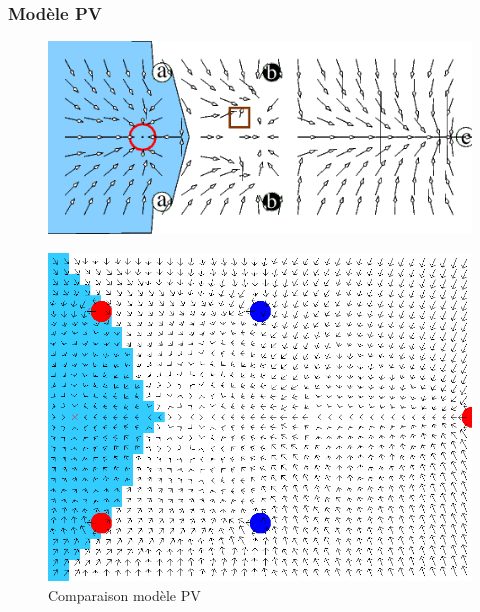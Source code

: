 \documentclass{beamer}
\begin{document}
\begin{frame}
  \frametitle{Modèle PV}
  \begin{figure}
    \centering
    \includegraphics[scale=0.3]{pv_article.png}
  \end{figure}
  \begin{figure}
    \centering
    \includegraphics[scale=0.15]{pv1_res.png}
    \caption{Comparaison modèle PV}
  \end{figure}  
\end{frame}
\end{document}

